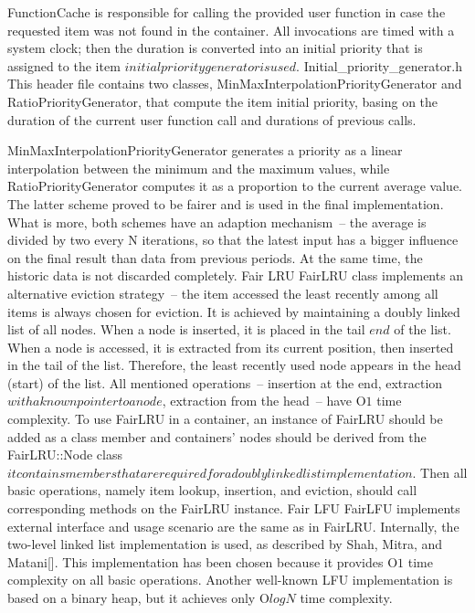 FunctionCache is responsible for calling the provided user function in case the requested item was not found in the container. All invocations are timed with a system clock; then the duration is converted into an initial priority that is assigned to the item \(initial priority generator is used\).
Initial\_priority\_generator.h
This header file contains two classes, MinMaxInterpolationPriorityGenerator and RatioPriorityGenerator, that compute the item initial priority, basing on the duration of the current user function call and durations of previous calls.

MinMaxInterpolationPriorityGenerator generates a priority as a linear interpolation between the minimum and the maximum values, while RatioPriorityGenerator computes it as a proportion to the current average value. The latter scheme proved to be fairer and is used in the final implementation. What is more, both schemes have an adaption mechanism~-- the average is divided by two every N iterations, so that the latest input has a bigger influence on the final result than data from previous periods. At the same time, the historic data is not discarded completely.
Fair LRU
FairLRU class implements an alternative eviction strategy~-- the item accessed the least recently among all items is always chosen for eviction. It is achieved by maintaining a doubly linked list of all nodes. When a node is inserted, it is placed in the tail \(end\) of the list. When a node is accessed, it is extracted from its current position, then inserted in the tail of the list. Therefore, the least recently used node appears in the head (start) of the list. All mentioned operations~-- insertion at the end, extraction \(with a known pointer to a node\), extraction from the head~-- have O\(1\) time complexity.
To use FairLRU in a container, an instance of FairLRU should be added as a class member and containers’ nodes should be derived from the FairLRU::Node class \(it contains members that are required for a doubly linked list implementation\). Then all basic operations, namely item lookup, insertion, and eviction, should call corresponding methods on the FairLRU instance.
Fair LFU
FairLFU implements external interface and usage scenario are the same as in FairLRU. Internally, the two-level linked list implementation is used, as described by Shah, Mitra, and Matani[]. This implementation has been chosen because it provides O\(1\) time complexity on all basic operations. Another well-known LFU implementation is based on a binary heap, but it achieves only O\(log N\) time complexity.

